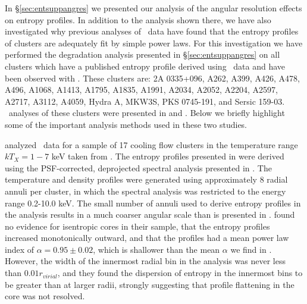 In \S \ref{sec:entsuppangres} we presented our analysis of the angular
resolution effects on entropy profiles. In addition to the analysis
shown there, we have also investigated why previous analyses of
\xmm\ data have found that the entropy profiles of clusters are
adequately fit by simple power laws. For this investigation we have
performed the degradation analysis presented in \S \ref{sec:entsuppangres} on
all clusters which have a published entropy profile derived using
\xmm\ data and have been observed with \chandra. These clusters are:
2A 0335+096, A262, A399, A426, A478, A496, A1068, A1413, A1795, A1835,
A1991, A2034, A2052, A2204, A2597, A2717, A3112, A4059, Hydra A,
MKW3S, PKS 0745-191, and Sersic 159-03. \xmm\ analyses of these
clusters were presented in \citet{piffaretti05} and
\citet{pratt06}. Below we briefly highlight some of the important
analysis methods used in these two studies.

\citet{piffaretti05} analyzed \xmm\ data for a sample of 17 cooling
flow clusters in the temperature range $kT_X = 1-7$ keV taken from
\citet{2004A&A...413..415K}. The entropy profiles presented in
\citet{piffaretti05} were derived using the PSF-corrected, deprojected
spectral analysis presented in \citet{2004A&A...413..415K}. The
temperature and density profiles were generated using approximately 8
radial annuli per cluster, in which the spectral analysis was
restricted to the energy range 0.2-10.0 keV. The small number of
annuli used to derive entropy profiles in the \citet{piffaretti05}
analysis results in a much coarser angular scale than is presented in
\accept. \citet{piffaretti05} found no evidence for isentropic cores
in their sample, that the entropy profiles increased monotonically
outward, and that the profiles had a mean power law index of $\alpha =
0.95 \pm 0.02$, which is shallower than the mean $\alpha$ we find in
\accept. However, the width of the innermost radial bin in the
\citet{piffaretti05} analysis was never less than $0.01 r_{virial}$,
and they found the dispersion of entropy in the innermost bins to be
greater than at larger radii, strongly suggesting that profile
flattening in the core was not resolved.

